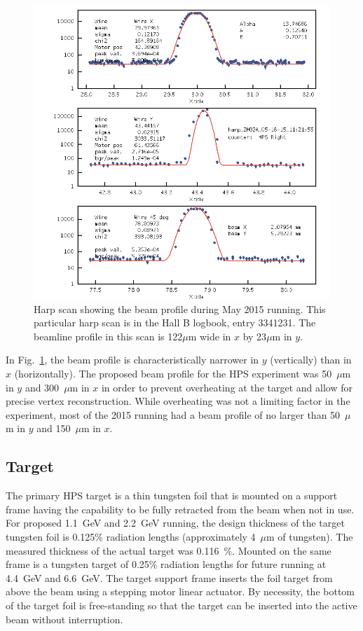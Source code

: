 \begin{figure}[H]
  \centering
      \includegraphics[width=1.0\textwidth]{pics/experiment/harpScan.png}
  \caption{Harp scan showing the beam profile during May 2015 running. This particular harp scan is in the Hall B logbook, entry 3341231. The beamline profile in this scan is 122$\mu$m wide in $x$ by 23$\mu$m in $y$.}
  \label{Figure:harpScan}
\end{figure}

In Fig.~\ref{Figure:harpScan}, the beam profile is characteristically narrower in $y$ (vertically) than in $x$ (horizontally). The proposed beam profile for the HPS experiment was 50~$\mu$m in $y$ and 300~$\mu$m in $x$ in order to prevent overheating at the target and allow for precise vertex reconstruction. While overheating was not a limiting factor in the experiment, most of the 2015 running had a beam profile of no larger than 50~$\mu$m in $y$ and 150~$\mu$m in $x$. 

\subsection{Target}

The primary HPS target is a thin tungsten foil that is mounted on a support frame having the capability to be fully retracted from the beam when not in use. For proposed 1.1~GeV and 2.2~GeV running, the design thickness of the target tungsten foil is 0.125$\%$ radiation lengths (approximately 4~$\mu$m of tungsten). The measured thickness of the actual target was 0.116~$\%$. Mounted on the same frame is a tungsten target of 0.25$\%$ radiation lengths for future running at 4.4~GeV and 6.6~GeV. The target support frame inserts the foil target from above the beam using a stepping motor linear actuator. By necessity, the bottom of the target foil is free-standing so that the target can be inserted into the active beam without interruption.  

